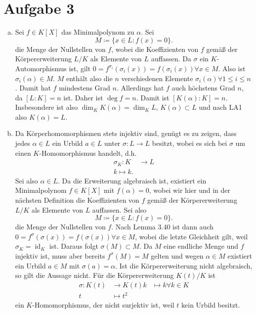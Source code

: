 \documentclass{article}
\begin{document}
    \section*{Aufgabe 3}
    \begin{enumerate}[(a)]
        \item Sei $f \in K[X]$ das Minimalpolynom zu $\alpha$. Sei  
        \[
            M \coloneqq \{x \in L\colon f(x) = 0\}.
        \] die Menge der Nullstellen von $f$, wobei die Koeffizienten von $f$ gemäß der Körpererweiterung $L/K$ als Elemente von $L$ auffassen. Da $\sigma$ ein $K$-Automorphismus ist, gilt $0 = f^{\sigma_i}(\sigma_i(x)) = f(\sigma_i(x)) \forall x \in M$. Also ist $\sigma_i(\alpha) \in M$. $M$ enthält also die $n$ verschiedenen Elemente $\sigma_i(\alpha) \forall 1\le i \le n$. 
        Damit hat $f$ mindestens Grad $n$. Allerdings hat $f$ auch höchstens Grad $n$, da $[L\colon K] = n$ ist. Daher ist $\deg f = n$. Damit ist $[K(\alpha)\colon K] = n$. Insbesondere ist also $\dim_K K(\alpha) = \dim_K L$, $K(\alpha) \subset L$ und nach LA1 also $K(\alpha) = L$.
        \item Da Körperhomomorphismen stets injektiv sind, genügt es zu zeigen, dass jedes $\alpha \in L$ ein Urbild $a \in L$ unter $\sigma\colon L \to L$ besitzt, wobei es sich bei $\sigma$ um einen $K$-Homomorphismus handelt, d.h. \begin{align*}
            \sigma_K \colon K &\to L\\
            k \mapsto k.
        \end{align*}
        Sei also $\alpha \in L$. Da die Erweiterung algebraisch ist, existiert ein Minimalpolynom $f \in K[X]$ mit $f(\alpha) = 0$, wobei wir hier und in der nächsten Definition die Koeffizienten von $f$ gemäß der Körpererweiterung $L/K$ als Elemente von $L$ auffassen. Sei also
        \[
            M \coloneqq \{x \in L\colon f(x) = 0\}.
        \] die Menge der Nullstellen von $f$. 
        Nach Lemma 3.40 ist dann auch $0 = f^\sigma(\sigma(x)) = f(\sigma(x)) \forall x \in M$, wobei die letzte Gleichheit gilt, weil $\sigma_K = \operatorname{id}_K$ ist. Daraus folgt $\sigma(M) \subset M$. Da $M$ eine endliche Menge und $f$ injektiv ist, muss aber bereits $f^\sigma(M) = M$ gelten und wegen $\alpha \in M$ existiert ein Urbild $a \in M$ mit $\sigma(a) = \alpha$.
        Ist die Körpererweiterung nicht algebraisch, so gilt die Aussage nicht. Für die Körpererweiterung $K(t)/K$ ist
        \begin{align*}
            \sigma \colon K(t) &\to K(t)
            k &\mapsto k \forall k \in K\\
            t &\mapsto t^2
        \end{align*}
        ein $K$-Homomorphismus, der nicht surjektiv ist, weil $t$ kein Urbild besitzt.
    \end{enumerate}
\end{document}
